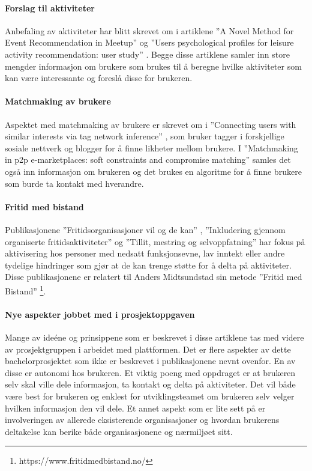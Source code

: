 \paragraph{Forslag til aktiviteter}
Anbefaling av aktiviteter har blitt skrevet om i artiklene ''A Novel Method for Event Recommendation in Meetup'' \cite{MEETUP:7:ASONAM17} og ''Users psychological profiles for leisure activity recommendation: user study'' \cite{PROFILES:10:CITREC17}. Begge disse artiklene samler inn store mengder informasjon om brukere som brukes til å beregne hvilke aktiviteter som kan være interessante og foreslå disse for brukeren.

\paragraph{Matchmaking av brukere}
Aspektet med matchmaking av brukere er skrevet om i ''Connecting users with similar interests via tag network inference'' \cite{TAGNETWORK:8:CIKM11}, som bruker tagger i forskjellige sosiale nettverk og blogger for å finne likheter mellom brukere. I ''Matchmaking in p2p e-marketplaces: soft constraints and compromise matching'' \cite{MATCHMAKING:9:ICEC10} samles det også inn informasjon om brukeren og det brukes en algoritme for å finne brukere som burde ta kontakt med hverandre.

\paragraph{Fritid med bistand}
Publikasjonene ''Fritidsorganisasjoner vil og de kan'' \cite{FRITID:12}, ''Inkludering gjennom organiserte fritidsaktiviteter'' \cite{INKLUDERING:11} og ''Tillit, mestring og selvoppfatning'' \cite{TILLIT:13} har fokus på aktivisering hos personer med nedsatt funksjonsevne, lav inntekt eller andre tydelige hindringer som gjør at de kan trenge støtte for å delta på aktiviteter. Disse publikasjonene er relatert til Anders Midtsundstad sin metode ''Fritid med Bistand'' \footnote{https://www.fritidmedbistand.no/}. 

\paragraph{Nye aspekter jobbet med i prosjektoppgaven}
Mange av ideéne og prinsippene som er beskrevet i disse artiklene tas med videre av prosjektgruppen i arbeidet med plattformen. Det er flere aspekter av dette bachelorprosjektet som ikke er beskrevet i publikasjonene nevnt ovenfor. En av disse er autonomi hos brukeren. Et viktig poeng med oppdraget er at brukeren selv skal ville dele informasjon, ta kontakt og delta på aktiviteter. Det vil både være best for brukeren og enklest for utviklingsteamet om brukeren selv velger hvilken informasjon den vil dele. Et annet aspekt som er lite sett på er involveringen av allerede eksisterende organisasjoner og hvordan brukerens deltakelse kan berike både organisasjonene og nærmiljøet sitt. 

